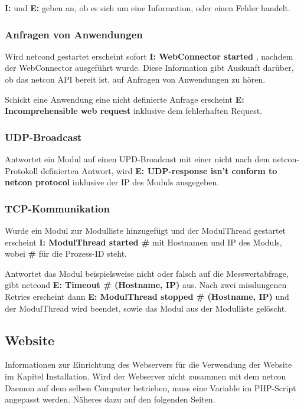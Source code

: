 \documentclass[a4paper,14pt,headsepline]{scrartcl}
\begin{document}
\textbf{I:} und \textbf{E:} geben an, ob es sich um eine Information, oder einen Fehler handelt. 

\newpage
\subsubsection*{Anfragen von Anwendungen}

Wird netcond gestartet erscheint sofort \textbf{I: WebConnector started} , nachdem der WebConnector ausgeführt wurde. Diese Information gibt Auskunft darüber, ob das netcon API bereit ist, auf Anfragen von Anwendungen zu hören. 

Schickt eine Anwendung eine nicht definierte Anfrage erscheint \textbf{E: Incomprehensible web request} inklusive dem fehlerhaften Request.

\subsubsection*{UDP-Broadcast}
Antwortet ein Modul auf einen UPD-Broadcast mit einer nicht nach dem netcon-Protokoll definierten Antwort, wird  \textbf{E: UDP-response isn’t conform to netcon protocol} inklusive der IP des Moduls ausgegeben.

\subsubsection*{TCP-Kommunikation}
Wurde ein Modul zur Modulliste hinzugefügt und der ModulThread gestartet erscheint \textbf{I: ModulThread started \#} mit Hostnamen und IP des Moduls, wobei \textbf{\#} für die Prozess-ID steht.

Antwortet das Modul beispielsweise nicht oder falsch auf die Messwertabfrage, gibt netcond \textbf{E: Timeout \# (Hostname, IP)} aus. Nach zwei misslungenen Retries erscheint dann \textbf{E: ModulThread stopped \# (Hostname, IP)} und der ModulThread wird beendet, sowie das Modul aus der Modulliste gelöscht. 

\newpage

\subsection{Website}
Informationen zur Einrichtung des Webservers für die Verwendung der Website im Kapitel Installation. Wird der Webserver nicht zusammen mit dem netcon Daemon auf dem selben Computer betrieben, muss eine Variable im PHP-Script angepasst werden. Näheres dazu auf den folgenden Seiten. 
\end{document}

